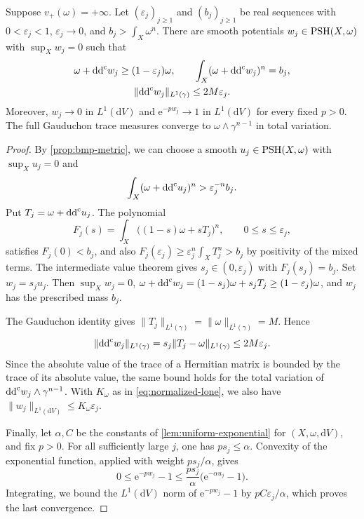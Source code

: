 \begin{corollary}\label{cor:smooth-prescribed-masses}
Suppose $v_+(\omega)=+\infty$. Let $(\varepsilon_j)_{j\geq1}$ and $(b_j)_{j\geq1}$ be real sequences with $0<\varepsilon_j<1$, $\varepsilon_j\to0$, and $b_j>\int_X\omega^n$. There are smooth potentials $w_j\in\mathrm{PSH}(X,\omega)$ with $\sup_Xw_j=0$ such that
\[
 \begin{gathered}
 \omega+\mathrm{dd}^{\mathrm{c}} w_j\geq(1-\varepsilon_j)\omega,
 \qquad
 \int_X(\omega+\mathrm{dd}^{\mathrm{c}} w_j)^n=b_j,
 \\
 \|\mathrm{dd}^{\mathrm{c}} w_j\|_{L^1(\gamma)}
 \leq2M\varepsilon_j.
 \end{gathered}
\]
Moreover, $w_j\to0$ in $L^1(\mathrm{d}V)$ and $\mathrm{e}^{-pw_j}\to1$ in $L^1(\mathrm{d}V)$ for every fixed $p>0$. The full Gauduchon trace measures converge to $\omega\wedge\gamma^{n-1}$ in total variation.
\end{corollary}
\begin{proof}
By \cref{prop:bmp-metric}, we can choose a smooth $u_j\in\mathrm{PSH}(X,\omega)$ with $\sup_Xu_j=0$ and
\[
 \int_X(\omega+\mathrm{dd}^{\mathrm{c}} u_j)^n>\varepsilon_j^{-n}b_j.
\]
Put $T_j=\omega+\mathrm{dd}^{\mathrm{c}} u_j$. The polynomial
\[
 F_j(s)=\int_X\bigl((1-s)\omega+sT_j\bigr)^n,
 \qquad 0\leq s\leq\varepsilon_j,
\]
satisfies $F_j(0)<b_j$, and also $F_j(\varepsilon_j)\geq\varepsilon_j^n\int_XT_j^n>b_j$ by positivity of the mixed terms. The intermediate value theorem gives $s_j\in(0,\varepsilon_j)$ with $F_j(s_j)=b_j$. Set $w_j=s_ju_j$. Then $\sup_Xw_j=0$, $\omega+\mathrm{dd}^{\mathrm{c}} w_j=(1-s_j)\omega+s_jT_j\geq(1-\varepsilon_j)\omega$, and $w_j$ has the prescribed mass $b_j$.

The Gauduchon identity gives $\|T_j\|_{L^1(\gamma)}=\|\omega\|_{L^1(\gamma)}=M$. Hence
\[
 \|\mathrm{dd}^{\mathrm{c}} w_j\|_{L^1(\gamma)}
 =s_j\|T_j-\omega\|_{L^1(\gamma)}
 \leq2M\varepsilon_j.
\]
Since the absolute value of the trace of a Hermitian matrix is bounded by the trace of its absolute value, the same bound holds for the total variation of $\mathrm{dd}^{\mathrm{c}} w_j\wedge\gamma^{n-1}$. With $K_\omega$ as in \eqref{eq:normalized-lone}, we also have $\|w_j\|_{L^1(\mathrm{d}V)}\leq K_\omega\varepsilon_j$.

Finally, let $\alpha,C$ be the constants of \cref{lem:uniform-exponential} for $(X,\omega,\mathrm{d}V)$, and fix $p>0$. For all sufficiently large $j$, one has $ps_j\leq\alpha$. Convexity of the exponential function, applied with weight $ps_j/\alpha$, gives
\[
 0\leq\mathrm{e}^{-pw_j}-1
 \leq\frac{ps_j}{\alpha}\bigl(\mathrm{e}^{-\alpha u_j}-1\bigr).
\]
Integrating, we bound the $L^1(\mathrm{d}V)$ norm of $\mathrm{e}^{-pw_j}-1$ by $pC\varepsilon_j/\alpha$, which proves the last convergence.
\end{proof}
